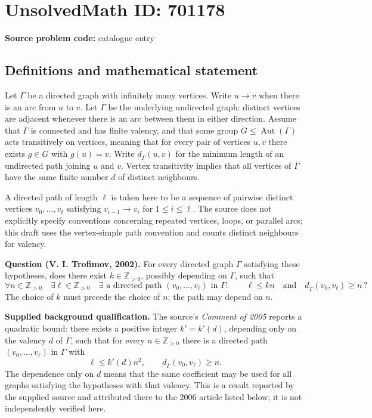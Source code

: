 \documentclass[11pt]{article}
\newcommand{\Z}{\mathbb{Z}}
\begin{document}
\section*{UnsolvedMath ID: 701178}
\textbf{Source problem code:} catalogue entry
\subsection{Definitions and mathematical statement}
Let \(\Gamma\) be a directed graph with infinitely many vertices. Write \(u\to v\) when there is an arc from \(u\) to \(v\). Let \(\overline{\Gamma}\) be the underlying undirected graph: distinct vertices are adjacent whenever there is an arc between them in either direction. Assume that \(\overline{\Gamma}\) is connected and has finite valency, and that some group \(G\leq\operatorname{Aut}(\Gamma)\) acts transitively on vertices, meaning that for every pair of vertices \(u,v\) there exists \(g\in G\) with \(g(u)=v\). Write \(d_{\overline{\Gamma}}(u,v)\) for the minimum length of an undirected path joining \(u\) and \(v\). Vertex transitivity implies that all vertices of \(\overline{\Gamma}\) have the same finite number \(d\) of distinct neighbours.

A directed path of length \(\ell\) is taken here to be a sequence of pairwise distinct vertices \(v_0,\ldots,v_\ell\) satisfying \(v_{i-1}\to v_i\) for \(1\leq i\leq\ell\). The source does not explicitly specify conventions concerning repeated vertices, loops, or parallel arcs; this draft uses the vertex-simple path convention and counts distinct neighbours for valency.

\textbf{Question (V. I. Trofimov, 2002).} For every directed graph \(\Gamma\) satisfying these hypotheses, does there exist \(k\in\Z_{>0}\), possibly depending on \(\Gamma\), such that
\[
\forall n\in\Z_{>0}\quad
\exists\ell\in\Z_{>0}\quad
\exists\text{ a directed path }(v_0,\ldots,v_\ell)\text{ in }\Gamma:
\qquad
\ell\leq kn
\quad\text{and}\quad
 d_{\overline{\Gamma}}(v_0,v_\ell)\geq n\,?
\]
The choice of \(k\) must precede the choice of \(n\); the path may depend on \(n\).

\textbf{Supplied background qualification.} The source's \emph{Comment of 2005} reports a quadratic bound: there exists a positive integer \(k'=k'(d)\), depending only on the valency \(d\) of \(\overline{\Gamma}\), such that for every \(n\in\Z_{>0}\) there is a directed path \((v_0,\ldots,v_\ell)\) in \(\Gamma\) with
\[
\ell\leq k'(d)n^2,
\qquad d_{\overline{\Gamma}}(v_0,v_\ell)\geq n.
\]
The dependence only on \(d\) means that the same coefficient may be used for all graphs satisfying the hypotheses with that valency. This is a result reported by the supplied source and attributed there to the 2006 article listed below; it is not independently verified here.
\end{document}
